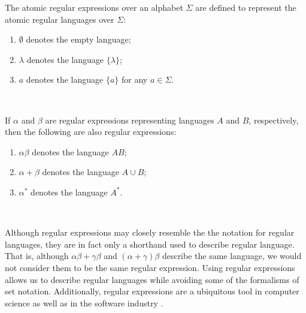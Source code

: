 \documentclass{bcthesis}
\renewcommand{\meo}[1]{}
\newcommand{\footcite}[2]{\xspace\cite[pg.~{#2}]{#1}\xspace}
\begin{document}
		\begin{definition}
			The atomic regular expressions over an alphabet $\Sigma$ are defined to represent the atomic regular languages over $\Sigma$:
			\begin{enumerate}[label=(\roman*), itemsep = -0.3 ex, nolistsep]
				\item $\emptyset$ denotes the empty language;
				\item $\lambda$ denotes the language $\{ \lambda \}$;
				\item $a$ denotes the language $\{ a \}$ for any $a \in \Sigma$.
			\end{enumerate}
			\footcite{hopcroft}{28--29}~\meo{todo: something about this citation}

			If $\alpha$ and $\beta$ are regular expressions representing languages $A$ and $B$, respectively, then the following are also regular expressions:
			\begin{enumerate}[label=(\roman*), itemsep = -0.3 ex, nolistsep]
				\item $\alpha \beta$ denotes the language $AB$;
				\item $\alpha + \beta$ denotes the language $A \cup B$;
				\item $\alpha^*$ denotes the language $A^*$.
			\end{enumerate}
			\footcite{hopcroft}{28--29}~\meo{todo: something about this citation}
		\end{definition}

		\begin{remark}
			Although regular expressions may closely resemble the the notation for regular languages, they are in fact only a shorthand used to describe regular language. 
			That is, although $\alpha \beta + \gamma \beta$ and $(\alpha + \gamma) \beta$ describe the same language, we would not consider them to be the same regular expression.
			Using regular expressions allows us to describe regular languages while avoiding some of the formalisms of set notation.
			Additionally, regular expressions are a ubiquitous tool in computer science as well as in the software industry \footcite{grep}{1}.
			\meo{
				Maybe mention that a language is regular if and only if it can be described by a regular expression.
			}
		\end{remark}


		\meo{
			I could mention here that regular expressions are an example of a grammar, shockingly belonging to the class of regular grammars.
		}
\end{document}

